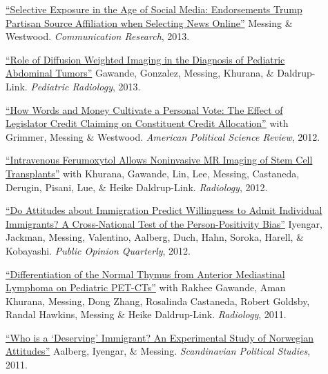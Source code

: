 \documentclass[letterpaper,11pt]{article}
\begin{document}
\begin{description}

\item[] \href{https://www.dropbox.com/s/sl847m7z7uzonro/CH3.pdf}{``Selective Exposure in the Age of Social Media: Endorsements Trump Partisan Source Affiliation when Selecting News Online''} Messing \& Westwood. 
\emph{Communication Research}, 2013.

\item[] \href{https://www.ncbi.nlm.nih.gov/pubmed/23666206}{``Role of Diffusion Weighted Imaging in the Diagnosis of Pediatric Abdominal Tumors''} Gawande, Gonzalez, Messing, Khurana, \& Daldrup-Link. 
\emph{Pediatric Radiology}, 2013.

\item[] \href{http://stanford.edu/~jgrimmer/cc.pdf}{``How Words and Money Cultivate a Personal Vote: The Effect of Legislator Credit Claiming on Constituent Credit Allocation''} with Grimmer, Messing \& Westwood.
\emph{American Political Science Review}, 2012.

\item[] \href{http://radiology.rsna.org/content/264/3/803.full.pdf+html}{``Intravenous Ferumoxytol Allows Noninvasive MR Imaging of Stem Cell Transplants''} with Khurana, Gawande, Lin, Lee, Messing, Castaneda, Derugin, Pisani, Lue, \& Heike Daldrup-Link. 
\emph{Radiology}, 2012.

\item[] \href{http://poq.oxfordjournals.org/content/early/2013/09/14/poq.nft024.full.pdf?keytype=ref&ijkey=ynq4b9uNIrXJy3I}{``Do Attitudes about Immigration Predict Willingness to Admit Individual Immigrants? A Cross-National Test of the Person-Positivity Bias''} Iyengar, Jackman, Messing, Valentino, Aalberg, Duch, Hahn, Soroka, Harell, \& Kobayashi. 
\emph{Public Opinion Quarterly}, 2012.

\item[] \href{http://radiology.rsna.org/content/early/2011/12/11/radiol.11110715.long}{``Differentiation of the Normal Thymus from Anterior Mediastinal Lymphoma on Pediatric PET-CTs''} with Rakhee Gawande, Aman Khurana, Messing, Dong Zhang, Rosalinda Castaneda, Robert Goldsby, Randal Hawkins, Messing \& Heike Daldrup-Link. 
\emph{Radiology}, 2011.

\item[] \href{http://onlinelibrary.wiley.com/doi/10.1111/j.1467-9477.2011.00280.x/abstract}{``Who is a `Deserving' Immigrant? An Experimental Study of Norwegian Attitudes''} Aalberg, Iyengar, \& Messing. 
\emph{Scandinavian Political Studies}, 2011.

\end{description}
\end{document}
